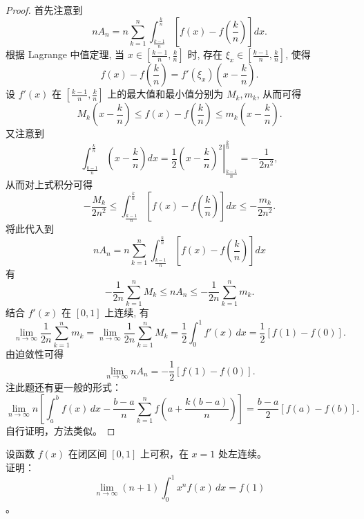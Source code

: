 \documentclass[lang=cn,12pt]{elegantbook}
\begin{document}
\begin{proof}
    首先注意到
    \[
    n A_n = n \sum_{k=1}^{n} \int_{\frac{k-1}{n}}^{\frac{k}{n}} \left[ f(x) - f\left( \frac{k}{n} \right) \right] dx.
    \]
    根据 Lagrange 中值定理, 当 $x \in \left[ \frac{k-1}{n}, \frac{k}{n} \right]$ 时, 存在 $\xi_x \in \left[ \frac{k-1}{n}, \frac{k}{n} \right]$, 使得
    \[
    f(x) - f\left( \frac{k}{n} \right) = f'(\xi_x) \left( x - \frac{k}{n} \right).
    \]
    设 $f'(x)$ 在 $\left[ \frac{k-1}{n}, \frac{k}{n} \right]$ 上的最大值和最小值分别为 $M_k, m_k$, 从而可得
    \[
    M_k \left( x - \frac{k}{n} \right) \le f(x) - f\left( \frac{k}{n} \right) \le m_k \left( x - \frac{k}{n} \right).
    \]
    又注意到
    \[
    \int_{\frac{k-1}{n}}^{\frac{k}{n}} \left( x - \frac{k}{n} \right) dx
    = \left. \frac{1}{2} \left( x - \frac{k}{n} \right)^2 \right|_{\frac{k-1}{n}}^{\frac{k}{n}}
    = -\frac{1}{2n^2},
    \]
    从而对上式积分可得
    \[
    -\frac{M_k}{2n^2} \le \int_{\frac{k-1}{n}}^{\frac{k}{n}} \left[ f(x) - f\left( \frac{k}{n} \right) \right] dx \le -\frac{m_k}{2n^2}.
    \]
    将此代入到
    \[
    n A_n = n \sum_{k=1}^{n} \int_{\frac{k-1}{n}}^{\frac{k}{n}} \left[ f(x) - f\left( \frac{k}{n} \right) \right] dx
    \]
    有
    \[
    -\frac{1}{2n} \sum_{k=1}^{n} M_k \le n A_n \le -\frac{1}{2n} \sum_{k=1}^{n} m_k.
    \]
    结合 $f'(x)$ 在 $[0,1]$ 上连续, 有
    \[
    \lim_{n \to \infty} \frac{1}{2n} \sum_{k=1}^{n} m_k
    = \lim_{n \to \infty} \frac{1}{2n} \sum_{k=1}^{n} M_k
    = \frac{1}{2} \int_{0}^{1} f'(x) \, dx
    = \frac{1}{2} \left[ f(1) - f(0) \right].
    \]
    由迫敛性可得
    \[
    \lim_{n \to \infty} n A_n = -\frac{1}{2} \left[ f(1) - f(0) \right].
    \]
    注此题还有更一般的形式：
    \[
    \lim_{n \to \infty} n \left[ \int_{a}^{b} f(x) \, dx - \frac{b-a}{n} \sum_{k=1}^{n} f\left( a + \frac{k(b-a)}{n} \right) \right] = \frac{b-a}{2} \left[ f(a) - f(b) \right].
    \]
    自行证明，方法类似。
\end{proof}

\vspace{1em}

\begin{example}
设函数 $f(x)$ 在闭区间 $[0, 1]$ 上可积，在 $x = 1$ 处左连续。\\
证明：$$\lim_{n \to \infty} (n+1) \int_0^1 x^n f(x) \, dx = f(1)$$。
\end{example}
\end{document}
